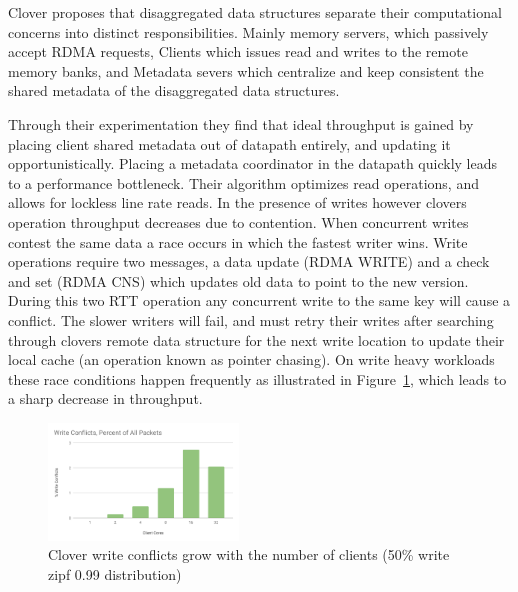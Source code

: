 
Clover proposes that disaggregated data structures separate their
computational concerns into distinct responsibilities. Mainly memory
servers, which passively accept RDMA requests, Clients which issues read and
writes to the remote memory banks, and Metadata severs which
centralize and keep consistent the shared metadata of the disaggregated
data structures.

Through their experimentation they find that ideal throughput is
gained by placing client shared metadata out of datapath entirely, and
updating it opportunistically. Placing a metadata coordinator in the
datapath quickly leads to a performance bottleneck. Their algorithm
optimizes read operations, and allows for lockless line rate reads. In
the presence of writes however clovers operation throughput decreases
due to contention. When concurrent writes contest the same data a race
occurs in which the fastest writer wins. Write operations require two
messages, a data update (RDMA WRITE) and a check and set (RDMA CNS)
which updates old data to point to the new version. During this two
RTT operation any concurrent write to the same key will cause a
conflict. The slower writers will fail, and must retry their writes
after searching through clovers remote data structure for the next
write location to update their local cache (an operation known as
pointer chasing). On write heavy workloads these race conditions
happen frequently as illustrated in Figure~\ref{fig:conflicts}, which
leads to a sharp decrease in throughput.

\begin{figure}
    \includegraphics[width=0.45\textwidth]{fig/write_conflicts.pdf}
    \caption{Clover write conflicts grow with the number of clients
    (50\% write zipf 0.99 distribution)}
    \label{fig:conflicts}
\end{figure}


